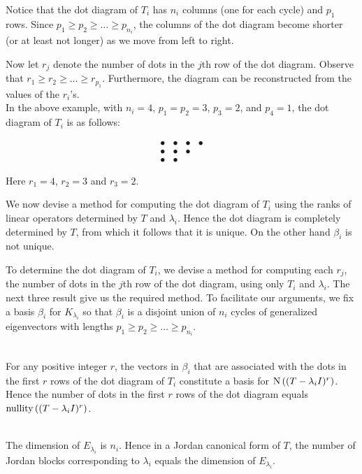 \begin{definition}
	Notice that the dot diagram of $T_i$ has $n_i$ columns (one for each cycle) and $p_1$ rows. Since $p_1 \geq p_2 \geq \dots \geq p_{n_i}$, the columns of the dot diagram become shorter (or at least not longer) as we move from left to right.

	Now let $r_j$ denote the number of dots in the $j$th row of the dot diagram. Observe that $r_1 \geq r_2 \geq \dots \geq r_{p_1}$. Furthermore, the diagram can be reconstructed from the values of the $r_i$'s.\\

	In the above example, with $n_i = 4$, $p_1 = p_2 = 3$, $p_3 = 2$, and $p_4 = 1$, the dot diagram of $T_i$ is as follows:

	\[\begin{array}{llll}
			\bullet & \bullet & \bullet & \bullet \\
			\bullet & \bullet & \bullet &         \\
			\bullet & \bullet &         &
		\end{array}\]

	Here $r_1 = 4$, $r_2 = 3$ and $r_3 = 2$.

	We now devise a method for computing the dot diagram of $T_i$ using the ranks of linear operators determined by $T$ and $\lambda_i$. Hence the dot diagram is completely determined by $T$, from which it follows that it is unique. On the other hand $\beta_i$ is not unique.

	To determine the dot diagram of $T_i$, we devise a method for computing each $r_j$, the number of dots in the $j$th row of the dot diagram, using only $T_i$ and $\lambda_i$. The next three result give us the required method. To facilitate our arguments, we fix a basis $\beta_i$ for $K_{\lambda_i}$ so that $\beta_i$ is a disjoint union of $n_i$ cycles of generalized eigenvectors with lengths $p_1 \geq p_2 \geq \dots \geq p_{n_i}$.
\end{definition}

\begin{theorem}
	\hfill\\
	For any positive integer $r$, the vectors in $\beta_i$ that are associated with the dots in the first $r$ rows of the dot diagram of $T_i$ constitute a basis for $\text{N}\left((T - \lambda_i I)^r\right)$. Hence the number of dots in the first $r$ rows of the dot diagram equals $\text{nullity}\left((T - \lambda_i I)^r\right)$.
\end{theorem}

\begin{corollary}
	\hfill\\
	The dimension of $E_{\lambda_i}$ is $n_i$. Hence in a Jordan canonical form of $T$, the number of Jordan blocks corresponding to $\lambda_i$ equals the dimension of $E_{\lambda_i}$.
\end{corollary}

